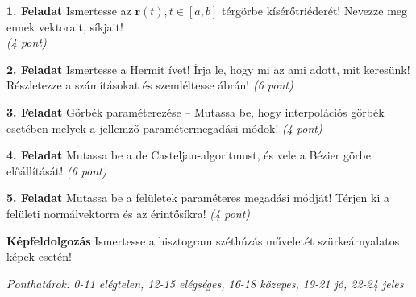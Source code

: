 \documentclass[a4paper]{article}
\begin{document}
\bigskip

\noindent \textbf{1. Feladat}
Ismertesse az $\textbf{r}(t), t \in [a, b]$ térgörbe kísérőtriéderét! Nevezze meg ennek vektorait, síkjait! \\
\textit{(4 pont)}

\bigskip

\noindent \textbf{2. Feladat}
Ismertesse a Hermit ívet!
Írja le, hogy mi az ami adott, mit keresünk! Részletezze a számításokat és szemléltesse ábrán!
\textit{(6 pont)}

\bigskip

\noindent \textbf{3. Feladat}
Görbék paraméterezése -- Mutassa be, hogy interpolációs görbék esetében melyek a jellemző paramétermegadási módok!
\textit{(4 pont)}

\bigskip

\noindent \textbf{4. Feladat}
Mutassa be a de Casteljau-algoritmust, és vele a Bézier görbe előállítását!
\textit{(6 pont)}

\bigskip

\noindent \textbf{5. Feladat}
Mutassa be a felületek paraméteres megadási módját! Térjen ki a felületi normálvektorra és az érintősíkra!
\textit{(4 pont)}

\bigskip

\noindent \textbf{Képfeldolgozás} Ismertesse a hisztogram széthúzás műveletét szürkeárnyalatos képek esetén!

\bigskip

\noindent \textit{Ponthatárok: 0-11 elégtelen, 12-15 elégséges, 16-18 közepes, 19-21 jó, 22-24 jeles}
\end{document}
